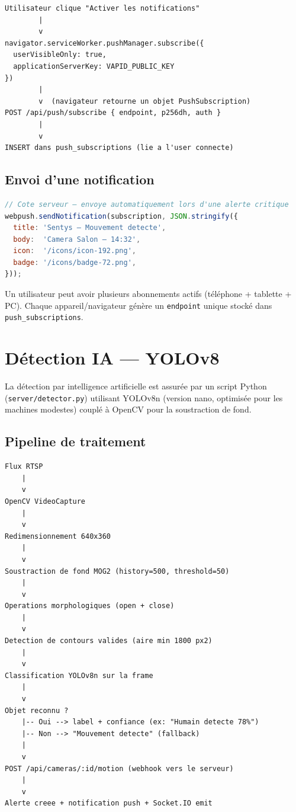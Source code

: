 \documentclass[12pt,a4paper]{article}
\begin{document}
\begin{lstlisting}
Utilisateur clique "Activer les notifications"
        |
        v
navigator.serviceWorker.pushManager.subscribe({
  userVisibleOnly: true,
  applicationServerKey: VAPID_PUBLIC_KEY
})
        |
        v  (navigateur retourne un objet PushSubscription)
POST /api/push/subscribe { endpoint, p256dh, auth }
        |
        v
INSERT dans push_subscriptions (lie a l'user connecte)
\end{lstlisting}

\subsection{Envoi d'une notification}

\begin{lstlisting}[language=javascript]
// Cote serveur — envoye automatiquement lors d'une alerte critique
webpush.sendNotification(subscription, JSON.stringify({
  title: 'Sentys — Mouvement detecte',
  body:  'Camera Salon — 14:32',
  icon:  '/icons/icon-192.png',
  badge: '/icons/badge-72.png',
}));
\end{lstlisting}

Un utilisateur peut avoir plusieurs abonnements actifs (téléphone + tablette + PC).
Chaque appareil/navigateur génère un \texttt{endpoint} unique stocké dans
\texttt{push\_subscriptions}.

\section{Détection IA — YOLOv8}

La détection par intelligence artificielle est assurée par un script Python
(\texttt{server/detector.py}) utilisant YOLOv8n (version nano, optimisée pour
les machines modestes) couplé à OpenCV pour la soustraction de fond.

\subsection{Pipeline de traitement}

\begin{lstlisting}
Flux RTSP
    |
    v
OpenCV VideoCapture
    |
    v
Redimensionnement 640x360
    |
    v
Soustraction de fond MOG2 (history=500, threshold=50)
    |
    v
Operations morphologiques (open + close)
    |
    v
Detection de contours valides (aire min 1800 px2)
    |
    v
Classification YOLOv8n sur la frame
    |
    v
Objet reconnu ?
    |-- Oui --> label + confiance (ex: "Humain detecte 78%")
    |-- Non --> "Mouvement detecte" (fallback)
    |
    v
POST /api/cameras/:id/motion (webhook vers le serveur)
    |
    v
Alerte creee + notification push + Socket.IO emit
\end{lstlisting}
\end{document}
